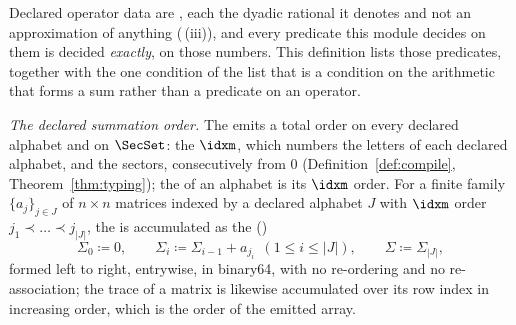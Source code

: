 \begin{definition}
\label{def:exact}
Declared operator data are , each the dyadic rational
it denotes and not an approximation of anything
(\,(iii)), and every predicate this module
decides on them is decided \emph{exactly}, on those numbers. This definition lists
those predicates, together with the one condition of the list that is a
condition on the arithmetic that forms a sum rather than a predicate on an
operator.

\emph{The declared summation order.} The  emits a
total order on every declared alphabet and on $\SecSet$: the
 $\idxm$, which numbers the letters of
each declared alphabet, and the sectors, consecutively from $0$
(Definition~\ref{def:compile}, Theorem~\ref{thm:typing}); the
 of an alphabet is its $\idxm$ order. For a finite
family $\{a_j\}_{j\in J}$ of $n\times n$ matrices indexed by a declared
alphabet $J$ with $\idxm$ order $j_1\prec\dots\prec j_{|J|}$, the
 is accumulated as the
 ()
\begin{equation}\label{eq:declorder}
  \Sigma_0\coloneqq0,\qquad
  \Sigma_i\coloneqq\Sigma_{i-1}+a_{j_i}\ \ (1\le i\le|J|),\qquad
  \Sigma\coloneqq\Sigma_{|J|},
\end{equation}
formed left to right, entrywise, in binary64, with no re-ordering and no
re-association; the trace of a matrix is likewise accumulated over its row
index in increasing order, which is the order of the emitted array.


\end{definition}

